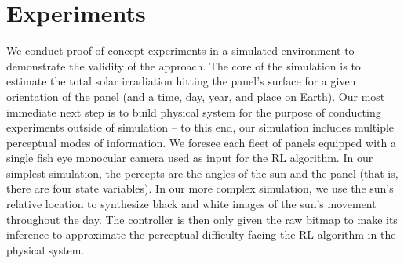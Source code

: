 \documentclass[11pt]{article}
\begin{document}
\section{Experiments}

We conduct proof of concept experiments in a simulated environment to demonstrate the validity of the approach. The core of the simulation is to estimate the total solar irradiation hitting the panel's surface for a given orientation of the panel (and a time, day, year, and place on Earth). Our most immediate next step is to build physical system for the purpose of conducting experiments outside of simulation -- to this end, our simulation includes multiple perceptual modes of information. We foresee each fleet of panels equipped with a single fish eye monocular camera used as input for the RL algorithm. In our simplest simulation, the percepts are the angles of the sun and the panel (that is, there are four state variables). In our more complex simulation, we use the sun's relative location to synthesize black and white images of the sun's movement throughout the day. The controller is then only given the raw bitmap to make its inference to approximate the perceptual difficulty facing the RL algorithm in the physical system. %
\end{document}
